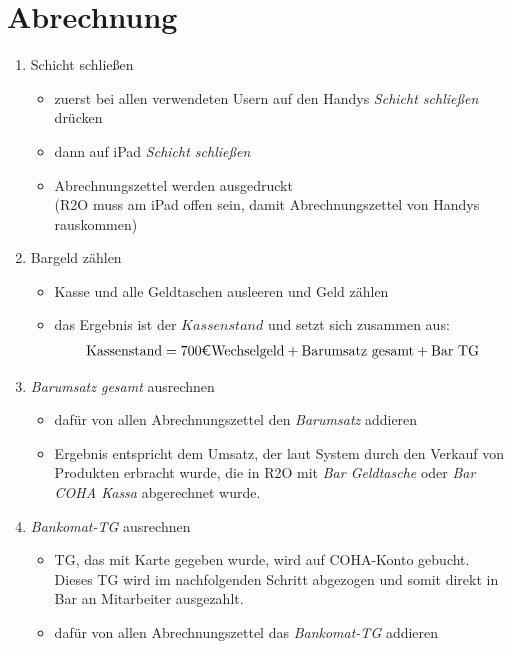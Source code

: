 \documentclass[a4paper,12pt]{article}
\newcounter{row}
\begin{document}
\section{Abrechnung}

\begin{enumerate}[itemsep=2em, leftmargin=1em]
    \item Schicht schließen
    \begin{itemize}[topsep=0pt, itemsep=1pt]
        \item[$\rightarrow$] zuerst bei allen verwendeten Usern auf den Handys \textit{Schicht schließen} drücken
        \item[$\rightarrow$] dann auf iPad \textit{Schicht schließen}
        \item[$\rightarrow$] Abrechnungszettel werden ausgedruckt \\ (R2O muss am iPad offen sein, damit Abrechnungszettel von Handys rauskommen)
    \end{itemize}

    \item Bargeld zählen
    \begin{itemize}[topsep=0pt, itemsep=1pt]
        \item[$\rightarrow$] Kasse und alle Geldtaschen ausleeren und Geld zählen
        \item[$\rightarrow$] das Ergebnis ist der $Kassenstand$ und setzt sich zusammen aus:
        \begin{align*}
            \text{Kassenstand} = 700\text{\euro} \text{Wechselgeld} + \text{Barumsatz gesamt} + \text{Bar TG}
        \end{align*}
    \end{itemize}

    \item \textit{Barumsatz gesamt} ausrechnen
    \begin{itemize}[topsep=0pt, itemsep=1pt]
         \item[$\rightarrow$] dafür von allen Abrechnungszettel den \textit{Barumsatz} addieren
         \item[$\rightarrow$] Ergebnis entspricht dem Umsatz, der laut System durch den Verkauf von Produkten erbracht wurde, die in R2O mit \textit{Bar Geldtasche} oder \textit{Bar COHA Kassa} abgerechnet wurde.
    \end{itemize}

    \item \textit{Bankomat-TG} ausrechnen
    \begin{itemize}[topsep=0pt, itemsep=1pt]
         \item[$\rightarrow$] TG, das mit Karte gegeben wurde, wird auf COHA-Konto gebucht. Dieses TG wird im nachfolgenden Schritt abgezogen und somit direkt in Bar an Mitarbeiter ausgezahlt.
         \item[$\rightarrow$] dafür von allen Abrechnungszettel das \textit{Bankomat-TG} addieren
    \end{itemize}


\end{enumerate}
\end{document}
